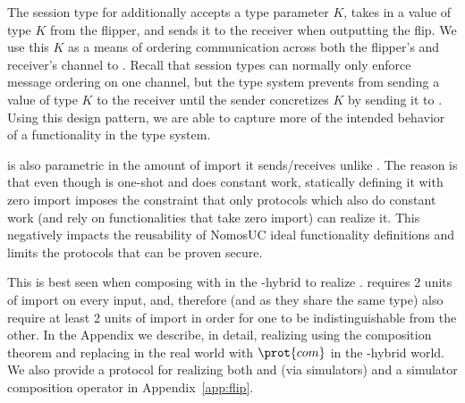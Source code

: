 The session type for \Fflip additionally accepts a type parameter $K$, takes in a value of type $K$ from the flipper, and sends it to the receiver when outputting the flip.
We use this $K$ as a means of ordering communication across both the flipper's and receiver's channel to \Fflip.
Recall that session types can normally only enforce message ordering on one channel, but the type system prevents \Fflip from sending a value of type $K$ to the receiver until the sender concretizes $K$ by sending it to \Fflip.
Using this design pattern, we are able to capture more of the intended behavior of a functionality in the type system.

\Fflip is also parametric in the amount of import it sends/receives unlike \Fropp. The reason is that even though \Fflip is one-shot and does constant work,
statically defining it with zero import imposes the constraint that only protocols which also do constant work (and rely on functionalities that take zero import) 
can realize it. 
This negatively impacts the reusability of NomosUC ideal functionality definitions and limits the protocols that can be proven secure.

This is best seen when composing  with  in the \Fropp-hybrid to realize \Fflip. \Fropp requires 2 units of import on every input, and, therefore  (and \Fflip as they share the same type) also require at least 2 units of import in order for one to be indistinguishable from the other.
In the Appendix we describe, in detail, realizing \Fflip using the composition theorem and replacing \Fcom in the real world with $\prot{com}$ in the \Fropp-hybrid world.
We also provide a protocol for realizing both \Fflip and \Fcom (via simulators) and a simulator composition operator in Appendix~\ref{app:flip}.


